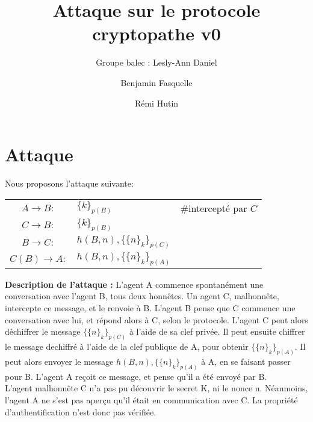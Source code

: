 \documentclass[11pt,a4paper]{article}
\author{Groupe balec : Lesly-Ann Daniel \and Benjamin Fasquelle \and Rémi Hutin}
\title{Attaque sur le protocole cryptopathe v0}
\date{}
\begin{document}
\maketitle


\section*{Attaque}

Nous proposons l'attaque suivante:


\begin{table}[!h]
\centering
\begin{tabular}{cll}
$A \rightarrow B:$ & $\{k\}_{p(B)} $ & \#intercepté par $C$  \\
$C \rightarrow B:$ & $\{k\}_{p(B)} $ & \\
$B \rightarrow C:$ & $h(B,n), \{\{n\}_k\}_{p(C)}$ & \\
$C(B) \rightarrow A:$ & $h(B,n), \{\{n\}_k\}_{p(A)}$ & \\
\end{tabular}
\end{table}



\textbf{Description de l'attaque :}
L'agent A commence spontanément une conversation avec l'agent B, tous deux honnêtes.
Un agent C, malhonnête, intercepte ce message, et le renvoie à B.
L'agent B pense que C commence une conversation avec lui, et répond alors à C, selon le protocole.
L'agent C peut alors déchiffrer le message $\{\{n\}_k\}_{p(C)}$ à l'aide de sa clef privée. Il peut ensuite chiffrer le message dechiffré à l'aide de la clef publique de A, pour obtenir $\{\{n\}_k\}_{p(A)}$. 
Il peut alors envoyer le message $h(B,n), \{\{n\}_k\}_{p(A)}$ à A, en se faisant passer pour B. 
L'agent A reçoit ce message, et pense qu'il a été envoyé par B. \\

L'agent malhonnête C n'a pas pu découvrir le secret K, ni le nonce n.
Néanmoins, l'agent A ne s'est pas aperçu qu'il était en communication avec C. 
La propriété d'authentification n'est donc pas vérifiée.
\end{document}
